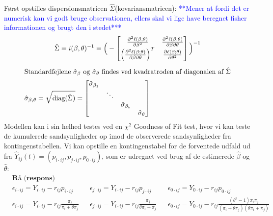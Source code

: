 \documentclass[11pt,a4paper]{article}
\begin{document}
Først opstilles dispersionsmatricen $\hat{\Sigma}$(kovariansmatricen): \textcolor{blue}{**Mener at fordi det er numerisk kan vi godt bruge observationen, ellers skal vi lige have beregnet fisher informationen og brugt den i stedet*** }
\begin{align*}
&\hat{\Sigma}=i(\beta,\theta)^{-1}=
\Big{(}-\begin{bmatrix}
\frac{\partial^2 \ell(\beta;\theta)}{\partial \beta^2} &\frac{\partial^2 \ell(\beta;\theta)}{\partial \beta \partial \theta} \\
\Big{(}\frac{\partial^2 \ell(\beta;\theta)}{\partial \beta \partial \theta}\Big{)}^T & \frac{\partial \ell(\beta;\theta)}{\partial \theta^2}
\end{bmatrix}\Big{)}^{-1}\\
\end{align*}
\begin{align}
\intertext{Standardfejlene $\hat{\sigma}_\beta$ og $\hat{\sigma}_\theta$ findes ved kvadratroden af diagonalen af $\hat{\Sigma}$}
\hat{\sigma}_{\beta,\theta}=\sqrt{\text{diag}(\hat{\Sigma})}=
\begin{bmatrix}
\hat{\sigma}_{\beta_1}& &\\
& \ddots & \\
& & \hat{\sigma}_{\beta_k} \\
& & & \hat{\sigma}_{\theta}
\end{bmatrix}
\end{align}
Modellen kan i sin helhed testes ved en $\chi^2$ Goodness of Fit test, hvor vi kan teste de kumulerede sandsynligheder op imod de observerede sandsynligheder fra kontingenstabellen. Vi kan opstille en kontingenstabel for de forventede udfald ud fra $\hat{Y}_{ij}(t) = (p_{i\cdot ij},p_{j\cdot ij},p_{0\cdot ij})$, som er udregnet ved brug af de estimerede $\hat{\beta}$ og $\hat{\theta}$:
\begin{align*}
&\textbf{Rå (respons) residualer  }\\
&\epsilon_{i\cdot ij}=Y_{i\cdot ij}-r_{ij}p_{i\cdot ij}
&&\epsilon_{j\cdot ij}=Y_{i\cdot ij}-r_{ij} p_{j\cdot ij}
&&\epsilon_{0\cdot ij}=Y_{0\cdot ij}-r_{ij} p_{0\cdot ij}\\
&\epsilon_{i\cdot ij}=Y_{i\cdot ij}-r_{ij} \frac{\pi_i}{\pi_i+\theta \pi_j}
&&\epsilon_{j\cdot ij}=Y_{i\cdot ij}-r_{ij} \frac{\pi_j}{\theta \pi_i+ \pi_j}
&&\epsilon_{0\cdot ij}=Y_{0\cdot ij}-r_{ij} \frac{(\theta^2-1)\pi_i\pi_j}{(\pi_i+\theta \pi_j)(\theta
\pi_i + \pi_j)}\\
\end{align*}
\end{document}
